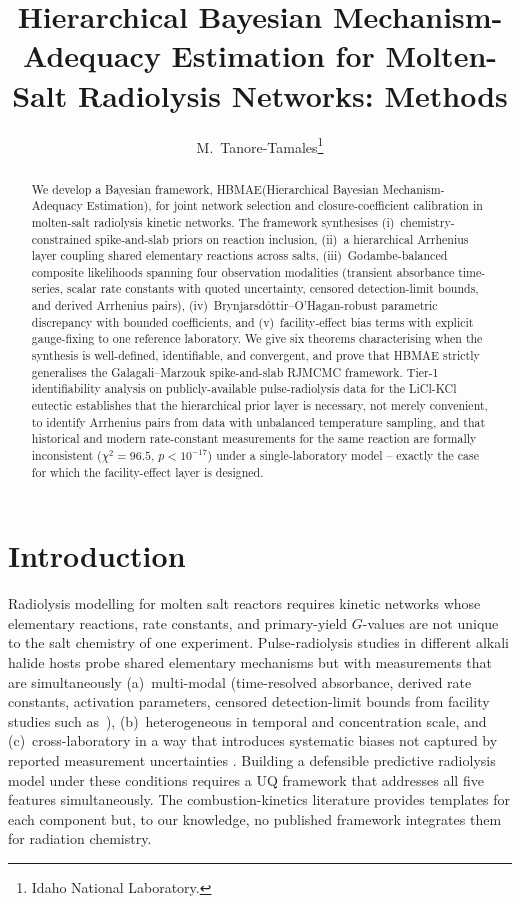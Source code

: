 \documentclass[11pt]{article}
\title{Hierarchical Bayesian Mechanism-Adequacy Estimation for Molten-Salt Radiolysis Networks: Methods}
\author{M.\ Tanore-Tamales\thanks{Idaho National Laboratory.}}
\date{}
\theoremstyle{definition}
\theoremstyle{remark}
\newcommand{\HBMAE}{HBMAE\xspace}
\begin{document}
\maketitle

\begin{abstract}
We develop a Bayesian framework, \HBMAE (Hierarchical Bayesian Mechanism-Adequacy Estimation),
for joint network selection and closure-coefficient calibration in molten-salt radiolysis
kinetic networks. The framework synthesises (i)~chemistry-constrained spike-and-slab priors
on reaction inclusion, (ii)~a hierarchical Arrhenius layer coupling shared elementary
reactions across salts, (iii)~Godambe-balanced composite likelihoods spanning four
observation modalities (transient absorbance time-series, scalar rate constants with
quoted uncertainty, censored detection-limit bounds, and derived Arrhenius pairs),
(iv)~Brynjarsdóttir--O'Hagan-robust parametric discrepancy with bounded coefficients,
and (v)~facility-effect bias terms with explicit gauge-fixing to one reference laboratory.
We give six theorems characterising when the synthesis is well-defined, identifiable,
and convergent, and prove that \HBMAE strictly generalises the Galagali--Marzouk
spike-and-slab RJMCMC framework. Tier-1 identifiability analysis on
publicly-available pulse-radiolysis data for the LiCl-KCl eutectic establishes that the
hierarchical prior layer is necessary, not merely convenient, to identify Arrhenius pairs
from data with unbalanced temperature sampling, and that historical and modern
rate-constant measurements for the same reaction are formally inconsistent
($\chi^2=96.5$, $p<10^{-17}$) under a single-laboratory model -- exactly the case for
which the facility-effect layer is designed.
\end{abstract}

\section{Introduction}

Radiolysis modelling for molten salt reactors requires kinetic networks whose elementary
reactions, rate constants, and primary-yield $G$-values are not unique to the salt
chemistry of one experiment. Pulse-radiolysis studies in different alkali halide hosts
\citep{Pikaev1982,Hagiwara1987,Iwamatsu2022,Conrad2023,Iwamatsu2026} probe shared
elementary mechanisms but with measurements that are simultaneously (a)~multi-modal
(time-resolved absorbance, derived rate constants, activation parameters, censored
detection-limit bounds from facility studies such as~\citealp{Phillips2022}),
(b)~heterogeneous in temporal and concentration scale, and (c)~cross-laboratory
in a way that introduces systematic biases not captured by reported measurement
uncertainties \citep{Iwamatsu2022}. Building a defensible predictive radiolysis model
under these conditions requires a UQ framework that addresses all five features
simultaneously. The combustion-kinetics literature provides templates for each component
\citep{GalagaliMarzouk2015,GalagaliMarzouk2019,Frenklach2007,Hegde2018,KennedyOHagan2001,
Vehtari2017,Varin2011} but, to our knowledge, no published framework integrates them
for radiation chemistry.
\end{document}
